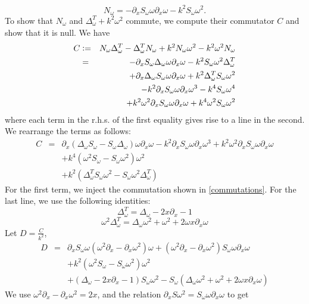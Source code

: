 \documentclass[a4paper]{article}
\begin{document}
\[N_\omega = -\partial_x S_\omega \omega \partial_x \omega - k^2 S_\omega \omega^2.\]
To show that $N_\omega$ and $\Delta_\omega^T + k^2\omega^2$ commute, we compute their commutator $C$ and show that it is null. 
We have 
\begin{eqnarray*}
	C &\mathrel{\mathop:}=& N_\omega \Delta_\omega^T - \Delta_\omega^T N_\omega + k^2N_\omega \omega^2 - k^2 \omega^2 N_\omega \\
	&=& -\partial_x S_\omega \Delta_\omega \omega \partial_x \omega  - k^2 S_\omega \omega^2 \Delta_\omega^T \\
	&& + \partial_x \Delta_\omega S_\omega \omega \partial_x \omega + k^2 \Delta_\omega^T S_\omega \omega^2 \\
	&& - k^2 \partial_x S_\omega \omega \partial_x \omega^3 - k^4 S_\omega \omega^4 \\
	&& + k^2 \omega^2 \partial_x S_\omega \omega \partial_x \omega + k^4 \omega^2 S_\omega \omega^2
\end{eqnarray*}
where each term in the r.h.s. of the first equality gives rise to a line in the second. We rearrange the terms as follows:
\begin{eqnarray*}
	C &=& \partial_x (\Delta_\omega S_\omega - S_\omega \Delta_\omega) \omega \partial_x \omega - k^2 \partial_x S_\omega \omega \partial_x \omega^3 + k^2 \omega^2 \partial_x S_\omega \omega\partial_x \omega\\	
	&& + k^4 (\omega^2 S_\omega - S_\omega \omega^2) \omega^2\\
	&& + k^2(\Delta_\omega^T S_\omega \omega^2 - S_\omega \omega^2 \Delta_\omega^T)
\end{eqnarray*}
For the first term, we inject the commutation shown in \autoref{commutations}. For the last line, we use the following identities: 
\[ \Delta_\omega^T = \Delta_\omega - 2x \partial_x - 1\]
\[ \omega^2 \Delta_\omega^T = \Delta_\omega \omega^2 + \omega^2 + 2 \omega x \partial_x \omega\]
Let $D = \frac{C}{k^2}$, 
\begin{eqnarray*}
	D &=& \partial_x S_\omega \omega (\omega^2\partial_x - \partial_x \omega^2) \omega  + (\omega^2 \partial_x - \partial_x \omega^2)S_\omega \omega \partial_x \omega\\
	&&+ k^2(\omega^2 S_\omega - S_\omega \omega^2) \omega^2\\
	&&+ (\Delta_\omega - 2x \partial_x - 1)S_\omega \omega^2 - S_\omega(\Delta_\omega \omega^2 + \omega^2 + 2\omega x \partial_x \omega) 
\end{eqnarray*}
We use $\omega^2 \partial_x - \partial_x \omega^2 = 2x$, and the relation $\partial_x S \omega^2 = S_\omega \omega \partial_x \omega$ to get
\end{document}
